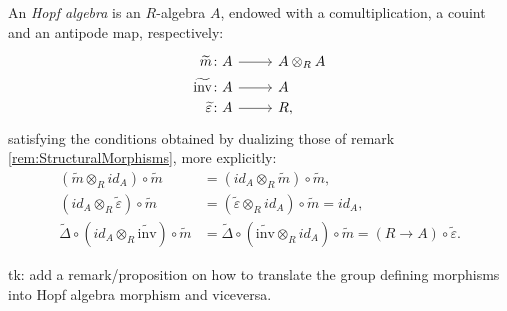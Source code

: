\documentclass[../Main]{subfiles}
\begin{document}
\begin{defn}
	An {\em Hopf algebra} is an $R$-algebra $A$,
	endowed with a comultiplication, a couint and an antipode map,
	respectively:
	\begin{equation}
			\begin{tikzcd}[row sep = 0ex
         ,/tikz/column 1/.append style={anchor=base east}
         ,/tikz/column 2/.append style={anchor=base west}
         ,/tikz/column 3/.append style={anchor=base east}]
			\widetilde{m}\colon A \arrow[r, "", rightarrow] &
			A \otimes_R A \\
			\widetilde{\mathrm{inv}}\colon A \arrow[r, "", rightarrow] &
			A \\
			\widetilde{\varepsilon} \colon A \arrow[r, "", rightarrow] &
			R,
		\end{tikzcd}
	\end{equation} 
	satisfying the conditions obtained by dualizing those
	of remark \ref{rem:StructuralMorphisms}, more explicitly:
	\begin{align}
		( \widetilde{m} \otimes_R id_A ) \circ \widetilde{m} &=
		( id_A \otimes_R \widetilde{m} ) \circ \widetilde{m},\\
		( id_A \otimes_R \widetilde{\varepsilon} ) \circ \widetilde{m} &=
		( \widetilde{\varepsilon} \otimes_R id_A ) \circ \widetilde{m} =
		id_A,\\
		\widetilde{\Delta} \circ ( id_A \otimes_R \widetilde{\mathrm{inv}} ) 
		\circ \widetilde{m} &=
		\widetilde{\Delta} \circ ( \widetilde{\mathrm{inv}} \otimes_R id_A ) 
		\circ \widetilde{m} =
		(R \to A) \circ \widetilde{\varepsilon}
	.\end{align} 
\end{defn}

\begin{rem}[]
	tk: add a remark/proposition on how to translate the group defining morphisms
	into Hopf algebra morphism and viceversa.
\end{rem}
\end{document}
